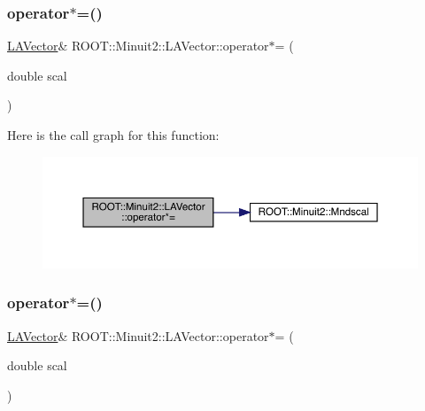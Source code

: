 \mbox{\label{classROOT_1_1Minuit2_1_1LAVector_a3acb9399e2b908c080e83ccd878eb349}} 
\subsubsection{\texorpdfstring{operator$\ast$=()}{operator*=()}\hspace{0.1cm}{\footnotesize\ttfamily [1/3]}}
{\footnotesize\ttfamily \mbox{\hyperlink{classROOT_1_1Minuit2_1_1LAVector}{L\+A\+Vector}}\& R\+O\+O\+T\+::\+Minuit2\+::\+L\+A\+Vector\+::operator$\ast$= (\begin{DoxyParamCaption}\item[{double}]{scal }\end{DoxyParamCaption})\hspace{0.3cm}{\ttfamily [inline]}}

Here is the call graph for this function\+:
\nopagebreak
\begin{figure}[H]
\begin{center}
\leavevmode
\includegraphics[width=350pt]{d3/d20/classROOT_1_1Minuit2_1_1LAVector_a3acb9399e2b908c080e83ccd878eb349_cgraph}
\end{center}
\end{figure}
\mbox{\label{classROOT_1_1Minuit2_1_1LAVector_a3acb9399e2b908c080e83ccd878eb349}} 
\subsubsection{\texorpdfstring{operator$\ast$=()}{operator*=()}\hspace{0.1cm}{\footnotesize\ttfamily [2/3]}}
{\footnotesize\ttfamily \mbox{\hyperlink{classROOT_1_1Minuit2_1_1LAVector}{L\+A\+Vector}}\& R\+O\+O\+T\+::\+Minuit2\+::\+L\+A\+Vector\+::operator$\ast$= (\begin{DoxyParamCaption}\item[{double}]{scal }\end{DoxyParamCaption})\hspace{0.3cm}{\ttfamily [inline]}}

